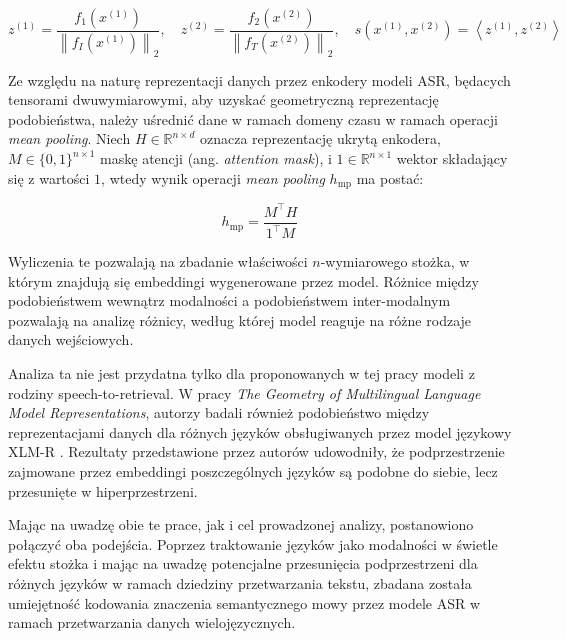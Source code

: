 \begin{equation}
z^{(1)} = \frac{f_1(x^{(1)})}{\left\| f_I(x^{(1)}) \right\|_2},
\quad
z^{(2)} = \frac{f_2(x^{(2)})}{\left\| f_T(x^{(2)}) \right\|_2},
\quad
s(x^{(1)}, x^{(2)}) = \left\langle z^{(1)}, z^{(2)} \right\rangle
\end{equation}

Ze względu na naturę reprezentacji danych przez enkodery modeli ASR, będacych tensorami dwuwymiarowymi, aby uzyskać geometryczną reprezentację podobieństwa, należy uśrednić dane w ramach domeny czasu w ramach operacji \textit{mean pooling}. Niech $H \in \mathbb{R}^{n \times d}$ oznacza reprezentację ukrytą enkodera, $M \in \{0,1\}^{n \times 1}$ maskę atencji (ang. \textit{attention mask}), i $1 \in \mathbb{R}^{n \times 1}$ wektor składający się z wartości $1$, wtedy wynik operacji \textit{mean pooling} $h_\text{mp}$ ma postać:

\begin{equation}
    h_{\text{mp}} =
    \frac{M^\top H}{1^\top M}
\end{equation}


Wyliczenia te pozwalają na zbadanie właściwości $n$-wymiarowego stożka, w którym znajdują się embeddingi wygenerowane przez model. Różnice między podobieństwem wewnątrz modalności a podobieństwem inter-modalnym pozwalają na analizę różnicy, według której model reaguje na różne rodzaje danych wejściowych.

Analiza ta nie jest przydatna tylko dla proponowanych w tej pracy modeli z rodziny speech-to-retrieval. W pracy \textit{The Geometry of Multilingual Language Model Representations}, autorzy badali również podobieństwo między reprezentacjami danych dla różnych języków obsługiwanych przez model językowy XLM-R \cite{chang2022geometry}. Rezultaty przedstawione przez autorów udowodniły, że podprzestrzenie zajmowane przez embeddingi poszczególnych języków są podobne do siebie, lecz przesunięte w hiperprzestrzeni.

Mając na uwadzę obie te prace, jak i cel prowadzonej analizy, postanowiono połączyć oba podejścia. Poprzez traktowanie języków jako modalności w świetle efektu stożka i mając na uwadzę potencjalne przesunięcia podprzestrzeni dla różnych języków w ramach dziedziny przetwarzania tekstu, zbadana została umiejętność kodowania znaczenia semantycznego mowy przez modele ASR w ramach przetwarzania danych wielojęzycznych.

